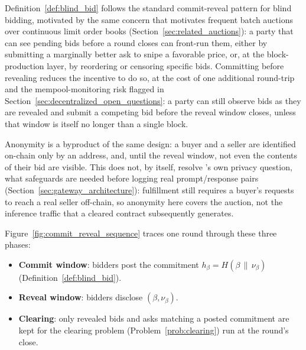 Definition~\ref{def:blind_bid} follows the standard commit-reveal pattern
for blind bidding, motivated by the same concern that motivates frequent
batch auctions over continuous limit order books
(Section~\ref{sec:related_auctions}): a party that can see pending
bids before a round closes can front-run them, either by submitting a
marginally better ask to snipe a favorable price, or, at the
block-production layer, by reordering or censoring specific bids.
Committing before revealing reduces the incentive to do so, at the cost of
one additional round-trip and the mempool-monitoring risk flagged in
Section~\ref{sec:decentralized_open_questions}: a party can still observe
bids as they are revealed and submit a competing bid before the reveal
window closes, unless that window is itself no longer than a single
block.

Anonymity is a byproduct of the same design: a buyer and a seller are
identified on-chain only by an address, and, until the reveal window, not
even the contents of their bid are visible. This does not, by itself,
resolve \NoesisServer's own privacy question, what safeguards are needed
before logging real prompt/response pairs (Section~\ref{sec:gateway_architecture}):
fulfillment still requires a buyer's requests to reach a real seller
off-chain, so anonymity here covers the auction, not the inference traffic
that a cleared contract subsequently generates.

Figure~\ref{fig:commit_reveal_sequence} traces one round through these
three phases:

\begin{itemize}
  \item \textbf{Commit window}: bidders post the commitment
    $h_\beta = H(\beta \,\|\, \nu_\beta)$ (Definition~\ref{def:blind_bid}).
  \item \textbf{Reveal window}: bidders disclose $(\beta, \nu_\beta)$.
  \item \textbf{Clearing}: only revealed bids and asks matching a posted
    commitment are kept for the clearing problem
    (Problem~\ref{prob:clearing}) run at the round's close.
\end{itemize}

